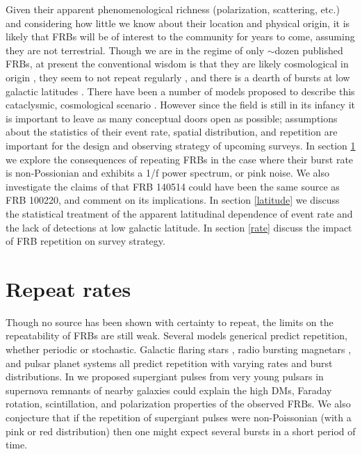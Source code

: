 \documentclass[useAMS,usenatbib]{mn2e}
\begin{document}
Given their apparent phenomenological richness
(polarization, scattering, etc.) and considering
how little we know about their location and physical 
origin, it is likely that FRBs will be of interest to the community for 
years to come, assuming they are not terrestrial.
Though we are in the regime of only $\sim$dozen published FRBs, 
at present the conventional wisdom is that they are likely cosmological
in origin \citep{2013Sci...341...53T}, they seem to not repeat regularly
\citep{2015MNRAS.454..457P}, and there is a dearth of bursts 
at low galactic latitudes \citep{2014ApJ...789L..26P, 2014ApJ...792...19B, 2015MNRAS.451.3278M}.
There have been 
a number of models proposed to describe this cataclysmic, cosmological 
scenario \citep{2012ApJ...760...64M, 2013PASJ...65L..12T, 2014A&A...562A.137F, 2015ApJ...814L..20M}.
However since the field is still in its infancy it is important to
leave as many conceptual doors open as possible;
assumptions about the statistics of their event rate, 
spatial distribution, and repetition are important for the design
and observing strategy of upcoming surveys. In section \ref{repeat} we explore the 
consequences of repeating FRBs in the case where their 
burst rate is non-Possionian and exhibits a 1/f power spectrum, 
or pink noise. We also investigate the claims of \cite{2015arXiv150701002M}
that FRB 140514 could have been the same source as FRB 100220, 
and comment on its implications. In section \ref{latitude}
we discuss the statistical treatment of the apparent latitudinal dependence 
of event rate and the lack of detections at low galactic latitude. In section \ref{rate}
discuss the impact of FRB repetition on survey strategy. 



\section{Repeat rates}
\label{repeat}

Though no source has been shown with certainty to repeat, 
the limits on the repeatability of FRBs are still weak. Several 
models generical predict repetition, whether periodic or stochastic. 
Galactic flaring stars \citep{2015arXiv150701002M}, radio bursting 
magnetars \citep{2007arXiv0710.2006P, 2015ApJ...807..179P}, and pulsar planet systems 
\citep{2014A&A...569A..86M} all predict repetition with varying 
rates and burst distributions. In \cite{2015arXiv150505535C} we 
proposed supergiant pulses from very young pulsars in supernova 
remnants of nearby galaxies could explain the high DMs, Faraday rotation, 
scintillation, and polarization properties of the observed FRBs. We also 
conjecture that if the repetition of supergiant pulses were non-Poissonian 
(with a pink or red distribution) 
then one might expect several bursts in a short period of time.
\end{document}
